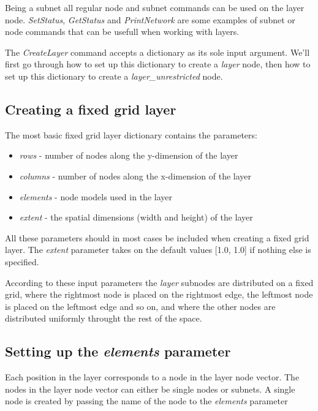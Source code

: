 \documentclass{article}
\begin{document}
Being a subnet all regular node and subnet commands can be used on the layer node. \emph{SetStatus}, \emph{GetStatus} and \emph{PrintNetwork} are some examples of subnet or node commands that can be usefull when working with layers.


The \emph{CreateLayer} command accepts a dictionary as its sole input argument. We'll first go through how to set up this dictionary to create a \emph{layer} node, then how to set up this dictionary to create a \emph{layer\_unrestricted} node.  

\subsection{Creating a fixed grid layer}

The most basic fixed grid layer dictionary contains the parameters:

\begin{itemize}
\item \emph{rows} - number of nodes along the y-dimension of the layer
\item \emph{columns} - number of nodes along the x-dimension of the layer
\item \emph{elements} - node models used in the layer
\item \emph{extent} - the spatial dimensions (width and height) of the layer
\end{itemize}

All these parameters should in most cases be included when creating a fixed grid layer. The \emph{extent} parameter takes on the default values [1.0, 1.0] if nothing else is specified.

According to these input parameters the \emph{layer} subnodes are distributed on a fixed grid, where the rightmost node is placed on the rightmost edge, the leftmost node is placed on the leftmost edge and so on, and where the other nodes are distributed uniformly throught the rest of the space. 

\subsection{Setting up the \emph{elements} parameter}

Each position in the layer corresponds to a node in the layer node vector. The nodes in the layer node vector can either be single nodes or subnets. A single node is created by passing the name of the node to the \emph{elements} parameter
\end{document}

